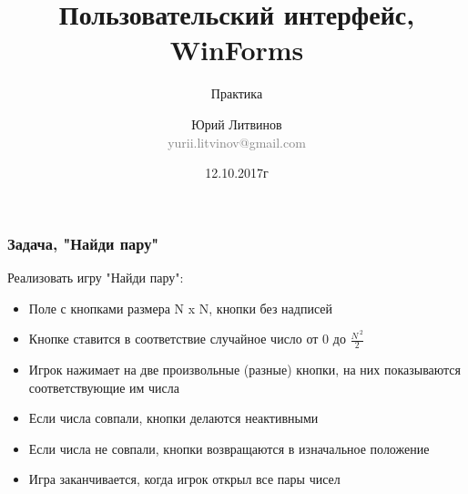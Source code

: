 \documentclass[xetex,mathserif,serif]{beamer}
\title{Пользовательский интерфейс, WinForms}
\subtitle{Практика}
\author[Юрий Литвинов]{Юрий Литвинов\\\small{\textcolor{gray}{yurii.litvinov@gmail.com}}}
\date{12.10.2017г}
\begin{document}
	\frame{\titlepage}

	\begin{frame}
		\frametitle{Задача, "Найди пару"}
		Реализовать игру "Найди пару":
		\begin{itemize}
			\item Поле с кнопками размера N x N, кнопки без надписей
			\item Кнопке ставится в соответствие случайное число от 0 до $\frac{N ^{\ 2}}{2}$
			\item Игрок нажимает на две произвольные (разные) кнопки, на них показываются соответствующие им числа 
			\item Если числа совпали, кнопки делаются неактивными
			\item Если числа не совпали, кнопки возвращаются в изначальное положение
			\item Игра заканчивается, когда игрок открыл все пары чисел
		\end{itemize}
	\end{frame}
\end{document}
